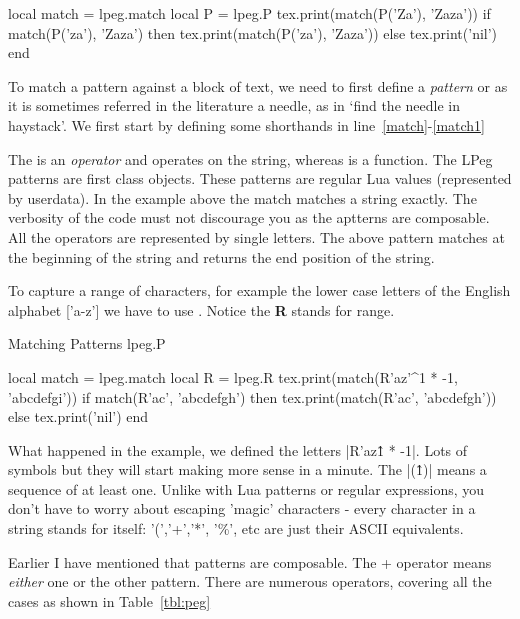 \begin{texexample}{}{}
\begin{luacode}
   local match = lpeg.match   
   local P = lpeg.P           
   tex.print(match(P('Za'), 'Zaza'))
   if match(P('za'), 'Zaza') then 
      tex.print(match(P('za'), 'Zaza')) 
   else tex.print('nil') 
   end
\end{luacode}
\end{texexample}

To match a pattern against a block of text, we need to first define a \emph{pattern} or as it is sometimes referred in the literature a needle, as in `find the needle in haystack'. We first start by defining some shorthands in line~\ref{match}-\ref{match1}



The  is an \emph{operator} and operates on the string, whereas  is a function. The LPeg patterns are first class objects. These patterns are regular Lua values (represented by userdata). In the example above the match matches a string exactly. The verbosity of the code must not discourage you as the aptterns are composable. All the operators are represented by single letters.  The above pattern matches at the beginning of the string and returns the end position of the string. 

To capture a range of characters, for example the lower case letters of the English alphabet  ['a-z'] we have to use . Notice the \textbf{R} stands for range.

\begin{texexample}{Matching Patterns lpeg.P}{}
\begin{luacode}
   local match = lpeg.match 
   local R = lpeg.R 
   tex.print(match(R'az'^1 * -1, 'abcdefgi'))
   if match(R'ac', 'abcdefgh') then 
      tex.print(match(R'ac', 'abcdefgh')) 
   else 
      tex.print('nil') 
   end
\end{luacode}
\end{texexample}

What happened in the example, we defined the letters |R'az\^1 * -1|. Lots of symbols but they will start making more sense in a minute. The  |(\^1)| means a sequence of at least one. Unlike with Lua patterns or regular expressions, you don't have to worry about escaping 'magic' characters - every character in a string stands for itself: '(','+','*', '\%', etc are just their ASCII equivalents. 

Earlier I have mentioned that patterns are composable. The + operator means \emph{either} one or the other pattern. There are numerous operators, covering all the cases as shown in Table~\ref{tbl:peg}

